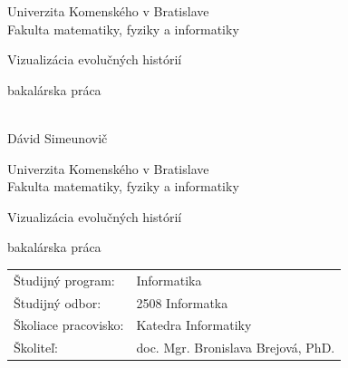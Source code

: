 \documentclass[12pt, oneside]{book}
\def\mfyear{2015}
\def\mftitle{Vizualizácia evolučných histórií}
\def\mfthesistype{bakalárska práca}
\def\mfauthor{Dávid Simeunovič}
\def\mfadvisor{doc. Mgr. Bronislava Brejová, PhD.}
\def\odbor{2508 Informatka} %
\def\program{ Informatika }
\def\stredisko{ Katedra Informatiky }
\begin{document}
     

\thispagestyle{empty}
\noindent

\begin{minipage}{0.95\textwidth}
\begin{center}
\sc  
\large
\vspace*{0.3cm} Univerzita Komenského v Bratislave\\
\vspace*{0.3cm} Fakulta matematiky, fyziky a informatiky\\
\end{center}
\end{minipage}

\vfill

\begin{minipage}{1.1\textwidth}
\begin{flushright}
\bigskip\bigskip
\centerline{\sc\LARGE\mftitle}
\centerline{\sc\mfthesistype}

\bigskip\bigskip\bigskip\bigskip
\end{flushright}
\end{minipage}
\vfill

\noindent \mfyear\\
\indent\mfauthor

\eject %


\thispagestyle{empty}
\noindent

\begin{minipage}{0.95\textwidth}
\begin{center}
\sc  
\large
\vspace*{0.3cm} Univerzita Komenského v Bratislave\\
\vspace*{0.3cm} Fakulta matematiky, fyziky a informatiky\\
\end{center}
\end{minipage}

\vfill

\begin{minipage}{1.1\textwidth}
\begin{flushright}
\bigskip\bigskip
\centerline{\sc\LARGE\mftitle}
\centerline{\sc\mfthesistype}
\end{flushright}

\bigskip
\vspace{3cm}
\bigskip
\begin{tabular}{ll}
Študijný program: & \program \\
Študijný odbor: & \odbor \\
Školiace pracovisko: & \stredisko \\
Školiteľ: & \mfadvisor \\
\end{tabular}

\end{minipage}
\vfill
\end{document}
